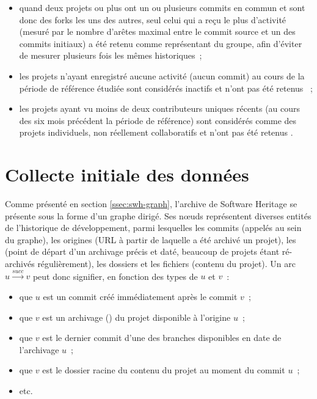 \begin{itemize}
    \item quand deux projets ou plus ont un ou plusieurs \glspl{commit} en commun et sont donc des
        \glspl{fork} les uns des autres, seul celui qui a reçu le plus d'activité (mesuré par le nombre
        d'arêtes maximal entre le \gls{commit} source et un des \glspl{commit} initiaux) a été retenu comme
        représentant du groupe, afin d'éviter de mesurer plusieurs fois les mêmes historiques ;
    \item les projets n'ayant enregistré aucune activité (aucun \gls{commit}) au cours de la période de
        référence étudiée sont considérés inactifs et n'ont pas été retenus
        \parencite[voir][]{mining-github-2014} ;
    \item les projets ayant vu moins de deux contributeurs uniques récents (au cours des six mois précédent la
        période de référence) sont considérés comme des projets individuels, non réellement collaboratifs et
        n'ont pas été retenus \parencite[voir][]{mining-github-2014}.
\end{itemize}

\section{Collecte initiale des données}

Comme présenté en section \ref{ssec:swh-graph}, l'archive de Software Heritage se présente sous la forme d'un
graphe dirigé. Ses nœuds représentent diverses entités de l'historique de développement, parmi lesquelles les
\glspl{commit} (appelés  au sein du graphe), les origines (URL à partir de laquelle a été
archivé un projet), les  (point de départ d'un archivage précis et daté, beaucoup de projets
étant ré-archivés régulièrement), les dossiers et les fichiers (contenu du projet). Un arc $u
\xrightarrow{succ} v$ peut donc signifier, en fonction des types de $u$ et $v$ : 

\begin{itemize}
    \item que $u$ est un \gls{commit} créé immédiatement après le \gls{commit} $v$ ;
    \item que $v$ est un archivage () du projet disponible à l'origine $u$ ;
    \item que $v$ est le dernier \gls{commit} d'une des branches disponibles en date de l'archivage $u$ ;
    \item que $v$ est le dossier racine du contenu du projet au moment du \gls{commit} $u$ ;
    \item etc.
\end{itemize}

